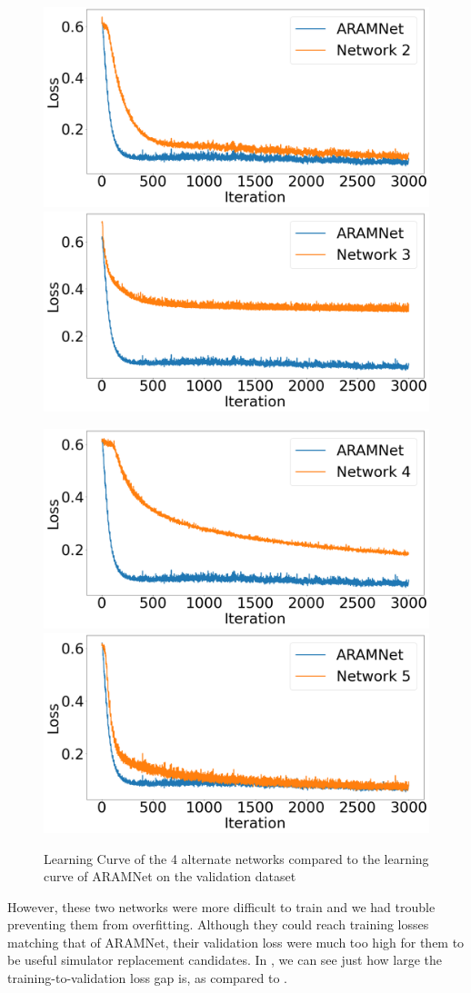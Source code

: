 \begin{figure}[htbp]
    \centering
    \begin{minipage}{\textwidth}
        \centering
        \includegraphics[width=.49\textwidth]{figures/explore-val-loss/network-2.png}\hfill
        \includegraphics[width=.49\textwidth]{figures/explore-val-loss/network-3.png}
    \end{minipage}\hfill
    \vspace{3mm}
    \begin{minipage}{\textwidth}
        \includegraphics[width=.49\textwidth]{figures/explore-val-loss/network-4.png}\hfill
        \includegraphics[width=.49\textwidth]{figures/explore-val-loss/network-5.png}
    \end{minipage}
    \caption{Learning Curve of the 4 alternate networks compared to the learning curve of ARAMNet on the validation dataset}
    \label{Figure:Training-Loss-All-Networks}
\end{figure}

However, these two networks were more difficult to train and we had trouble preventing them from overfitting.
Although they could reach training losses matching that of ARAMNet, their validation loss were much too high for them to be useful simulator replacement candidates.
In , we can see just how large the training-to-validation loss gap is, as compared to .

